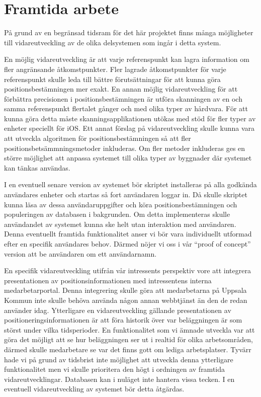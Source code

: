 \documentclass[a4paper,12pt]{article}
\begin{document}
\section{Framtida arbete}

På grund av en begränsad tidsram för det här projektet finns många möjligheter till vidareutveckling av de olika delsystemen som ingår i detta system.

En möjlig vidareutveckling är att varje referenspunkt kan lagra information om fler angränsande åtkomstpunkter. Fler lagrade åtkomstpunkter för varje referenspunkt skulle leda till bättre förutsättningar för att kunna göra positionsbestämningen mer exakt. En annan möjlig vidareutveckling för att förbättra precisionen i positionsbestämningen är utföra skanningen av en och samma referenspunkt flertalet gånger och med olika typer av hårdvara. För att kunna göra detta måste skanningsapplikationen utökas med stöd för fler typer av enheter speciellt för iOS. Ett annat förslag på vidareutveckling skulle kunna vara att utveckla algoritmen för positionsbestämningen så att fler positionsbetsämmningsmetoder inkluderas. Om fler metoder inkluderas ges en större möjlighet att anpassa systemet till olika typer av byggnader där systemet kan tänkas användas.

I en eventuell senare version av systemet bör skriptet installeras på alla godkända användares enheter och startas så fort användaren loggar in. Då skulle  skriptet kunna läsa av dessa användaruppgifter och köra positionsbestämningen och populeringen av databasen i bakgrunden. Om detta implementeras skulle användandet av systemet kunna ske helt utan interaktion med användaren. Denna eventuellt framtida funktionalitet anser vi bör vara individuellt utformad efter en specifik användares behov. Därmed nöjer vi oss i vår ``proof of concept'' version att be användaren om ett användarnamn.

En specifik vidareutveckling utifrån vår intressents perspektiv vore att integrera presentationen av positionsinformationen med intressentens interna medarbetarportal. Denna integrering skulle göra att medarbetarna på Uppsala Kommun inte skulle behöva använda någon annan webbtjänst än den de redan använder idag.
Ytterligare en vidareutveckling gällande presentationen av positioneringsinformationen är att föra historik över var beläggningen är som störst under vilka tidsperioder. En funktionalitet som vi ämnade utveckla var att göra det möjligt att se hur beläggningen ser ut i realtid för olika arbetsområden, därmed skulle medarbetare se var det finns gott om lediga arbetsplatser. Tyvärr hade vi på grund av tidsbrist inte möjlighet att utveckla denna ytterligare funktionalitet men vi skulle prioritera den högt i ordningen av framtida vidareutvecklingar.
Databasen kan i nuläget inte hantera vissa tecken. I en eventuell vidareutveckling av systemet bör detta åtgärdas.
\end{document}
